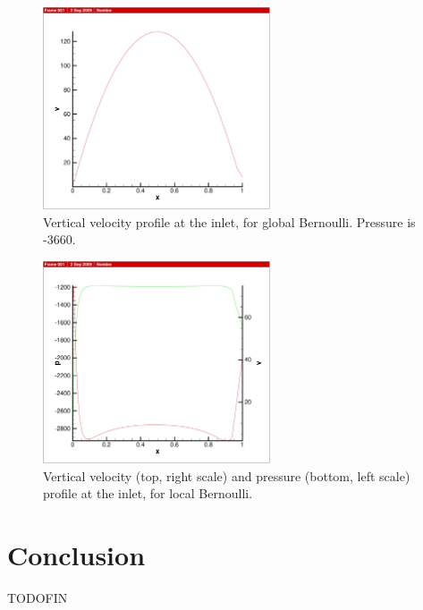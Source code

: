\documentclass[12pt]{article}
\begin{document}
\begin{figure}[h!]
\centering
\includegraphics[width=0.6\textwidth]{figs/GB-v}
\caption{Vertical velocity profile at the inlet, for global
  Bernoulli. Pressure is -3660.}
\label{fig:GB-v}
\end{figure}

\begin{figure}[h!]
\centering
\includegraphics[width=0.6\textwidth]{figs/LB-pv}
\caption{Vertical velocity (top, right scale) and pressure (bottom,
  left scale) profile at the inlet, for local Bernoulli.}
\label{fig:LB-pv}
\end{figure}


\section{Conclusion}
TODOFIN

\listoffigures
\listoftables




\end{document}
